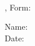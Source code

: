 \documentclass[12pt]{examdesign}
\begin{document}
%
\begin{examtop}
  \parbox{3in}{\classdata \\
               \examtype, Form: }
  \hfill
  \parbox{3in}{\normalsize Name: \hrulefill \\[2.0ex]
                           Date: \hrulefill }
  \bigskip
\end{examtop}

%
\end{document}
